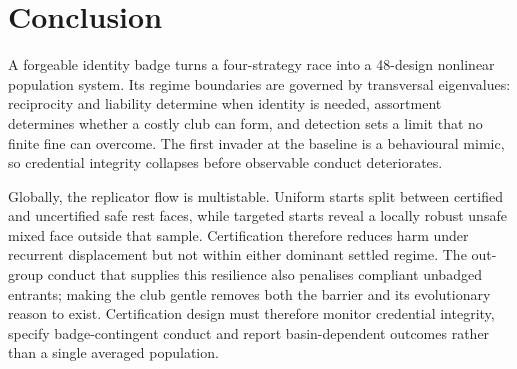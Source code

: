 \section{Conclusion}
\label{sec:conclusion}

A forgeable identity badge turns a four-strategy race into a 48-design
nonlinear population system. Its regime boundaries are governed by
transversal eigenvalues: reciprocity and liability determine when identity is
needed, assortment determines whether a costly club can form, and detection
sets a limit that no finite fine can overcome. The first invader at the
baseline is a behavioural mimic, so credential integrity collapses before
observable conduct deteriorates.

Globally, the replicator flow is multistable. Uniform starts split between
certified and uncertified safe rest faces, while targeted starts reveal a
locally robust unsafe mixed face outside that sample. Certification therefore
reduces harm under recurrent displacement but not within either dominant
settled regime. The out-group conduct that supplies this resilience also
penalises compliant unbadged entrants; making the club gentle removes both the
barrier and its evolutionary reason to exist. Certification design must
therefore monitor credential integrity, specify badge-contingent conduct and
report basin-dependent outcomes rather than a single averaged population.
